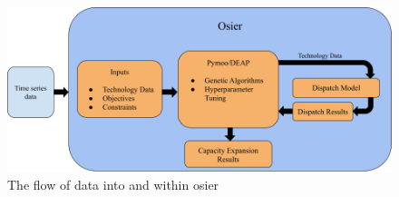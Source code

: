 \begin{graphicalabstract}

\begin{figure}[htbp!]
    \begin{center}
        \includegraphics[width=\textwidth]{./images/osier_flow.png}
    \end{center}
    \caption{The flow of data into and within \Gls{osier} \cite{dotson_osier_2024}}
    \label{fig:osier_flow}
\end{figure}

\end{graphicalabstract}
